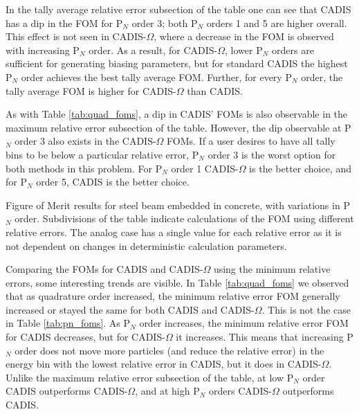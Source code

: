In the tally average relative error subsection of the table one can see that
CADIS has a dip in the FOM for P$_N$ order 3; both P$_N$ orders 1 and 5 are
higher overall. This effect is not seen in CADIS-$\Omega$, where a decrease in
the FOM is observed with increasing P$_N$ order. As a result, for
CADIS-$\Omega$, lower P$_N$ orders are sufficient for generating biasing
parameters, but for standard CADIS the highest P$_N$ order achieves the best
tally average FOM. Further, for every P$_N$ order, the tally average FOM is
higher for CADIS-$\Omega$ than CADIS.

As with Table \ref{tab:quad_foms}, a dip in CADIS' FOMs is also observable in the
maximum relative error subsection of the table. However, the dip observable at
P$_N$ order 3 also exists in the CADIS-$\Omega$ FOMs. If a user desires to have all
tally bins to be below a particular relative error, P$_N$ order 3 is the worst
option for both methods in this problem. For P$_N$ order 1 CADIS-$\Omega$ is the
better choice, and for P$_N$ order 5, CADIS is the better choice.

\begin{table}[h!]
  \centering
  
  \caption[Figure of Merit results for steel beam embedded in concrete, with
  variations in P$_{N}$ order.]{Figure of Merit results for steel beam embedded in concrete, with
    variations in P$_{N}$ order. Subdivisions of the table indicate
calculations of the FOM using different relative errors. The analog case has a
single value for each relative error as it is not dependent on changes in
deterministic calculation parameters.}
  \label{tab:pn_foms}
\end{table}

Comparing the FOMs for CADIS and CADIS-$\Omega$ using the minimum relative
errors, some interesting trends are visible. In Table \ref{tab:quad_foms} we
observed that as quadrature order increased, the minimum relative error FOM
generally increased or stayed the same for both CADIS and
CADIS-$\Omega$. This is not the case in Table \ref{tab:pn_foms}. As P$_N$ order
increases, the minimum relative error FOM for CADIS decreases, but for
CADIS-$\Omega$ it increases. This means that increasing P$_N$ order does not
move more particles (and reduce the relative error) in the energy bin with the
lowest relative error in CADIS, but it does in CADIS-$\Omega$. Unlike the
maximum relative error subsection of the table, at low P$_N$ order CADIS
outperforms CADIS-$\Omega$, and at high P$_N$ orders CADIS-$\Omega$ outperforms
CADIS.

